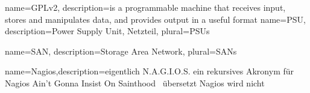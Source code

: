 	{
 	 name=GPLv2,
 	 description={is a programmable machine that receives input,
               stores and manipulates data, and provides
               output in a useful format}
	}
	{
	name=PSU,
	description={Power Supply Unit, Netzteil},
	plural=PSUs
	}

	{
	name=SAN,
	description={Storage Area Network},
	plural=SANs
	}
	
{
	name={Nagios},description={eigentlich N.A.G.I.O.S. ein rekursives Akronym für \glqq Nagios Ain’t Gonna Insist On Sainthood \grqq\ übersetzt \glqq Nagios wird nicht  }}


